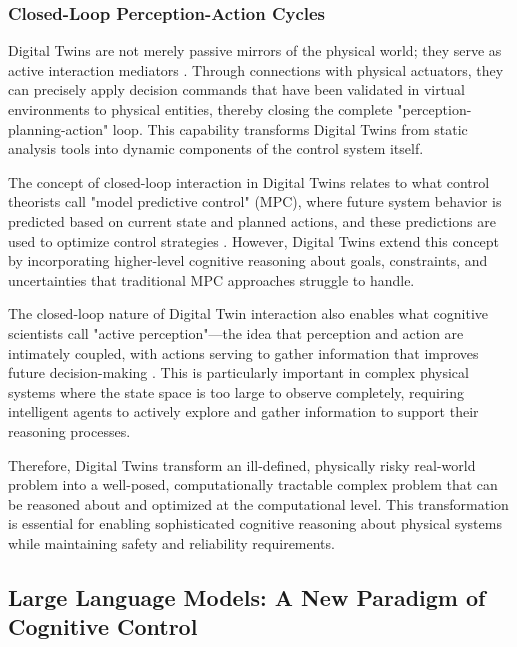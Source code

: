 \subsubsection{Closed-Loop Perception-Action Cycles}

Digital Twins are not merely passive mirrors of the physical world; they serve as active interaction mediators \cite{schluse2018experimentable, minerva2020digital}. Through connections with physical actuators, they can precisely apply decision commands that have been validated in virtual environments to physical entities, thereby closing the complete "perception-planning-action" loop. This capability transforms Digital Twins from static analysis tools into dynamic components of the control system itself.

The concept of closed-loop interaction in Digital Twins relates to what control theorists call "model predictive control" (MPC), where future system behavior is predicted based on current state and planned actions, and these predictions are used to optimize control strategies \cite{garcia1989model, rawlings2009model}. However, Digital Twins extend this concept by incorporating higher-level cognitive reasoning about goals, constraints, and uncertainties that traditional MPC approaches struggle to handle.

The closed-loop nature of Digital Twin interaction also enables what cognitive scientists call "active perception"—the idea that perception and action are intimately coupled, with actions serving to gather information that improves future decision-making \cite{gibson1979ecological, aloimonos1988active}. This is particularly important in complex physical systems where the state space is too large to observe completely, requiring intelligent agents to actively explore and gather information to support their reasoning processes.

Therefore, Digital Twins transform an ill-defined, physically risky real-world problem into a well-posed, computationally tractable complex problem that can be reasoned about and optimized at the computational level. This transformation is essential for enabling sophisticated cognitive reasoning about physical systems while maintaining safety and reliability requirements.

\subsection{Large Language Models: A New Paradigm of Cognitive Control}

